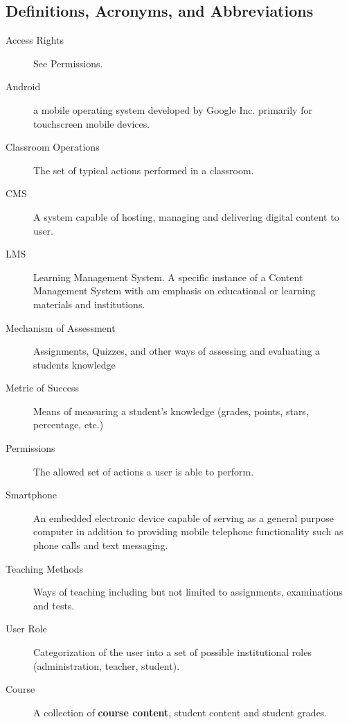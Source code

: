 \documentclass[]{article}
\begin{document}
\subsection{Definitions, Acronyms, and Abbreviations}
\label{sub:definitions_acronyms_and_abbreviations}
\begin{description}
  \item [Access Rights] See Permissions.

  \item [Android] a mobile operating system developed by Google Inc.  primarily
    for touchscreen mobile devices.

  \item [Classroom Operations] The set of typical actions performed in a
    classroom.

  \item [CMS] A system capable of hosting, managing and delivering digital
    content to user.

  \item [LMS] Learning Management System. A specific instance of a Content
    Management System with am emphasis on educational or learning materials and
    institutions.

  \item [Mechanism of Assessment] Assignments, Quizzes, and other ways of
    assessing and evaluating a students knowledge

  \item [Metric of Success] Means of measuring a student's knowledge (grades,
    points, stars, percentage, etc.)

  \item [Permissions] The allowed set of actions a user is able to perform.

  \item [Smartphone] An embedded electronic device capable of serving as a
    general purpose computer in addition to providing mobile telephone
    functionality such as phone calls and text messaging.

  \item [Teaching Methods] Ways of teaching including but not limited to
    assignments, examinations and tests.

  \item [User Role] Categorization of the user into a set of possible
    institutional roles (administration, teacher, student).

	\item [Course] A collection of \textbf{course content}, student content and student grades.


\end{description}
\end{document}
